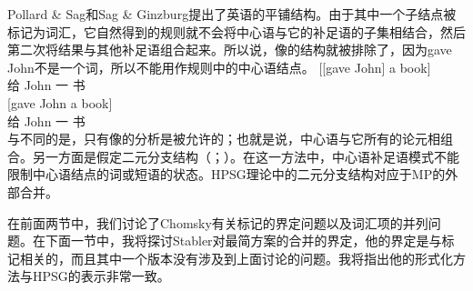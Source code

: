 Pollard \& Sag和Sag \& Ginzburg提出了英语的平铺结构。由于其中一个子结点被标记为词汇，它自然得到的规则就不会将中心语与它的补足语的子集相结合，然后第二次将结果与其他补足语组合起来。所以说，像的结构就被排除了，因为gave John不是一个词，所以不能用作规则中的中心语结点。
\eal
\ex\label{ex-gave-john-a-book-a} 
\gll {}[[gave John] a book]\\
       \hspaceThis{[[}给 John 一 书\\
\ex\label{ex-gave-john-a-book-b} 
\gll {}[gave John a book]\\
       \spacebr{}给 John 一 书\\
\zl
与不同的是，只有像的分析是被允许的；也就是说，中心语与它所有的论元相组合。另一方面是假定二元分支结构（\citealp{MuellerHPSGHandbook}；\citealp[1.2.2]{MOeDanish}）。在这一方法中，中心语补足语模式不能限制中心语结点的词或短语的状态。HPSG理论中的二元分支结构对应于MP的外部合并。

在前面两节中，我们讨论了Chomsky有关标记的界定问题以及词汇项的并列问题。在下面一节中，我将探讨Stabler对最简方案的合并的界定，他的界定是与标记相关的，而且其中一个版本没有涉及到上面讨论的问题。我将指出他的形式化方法与HPSG的表示非常一致。

